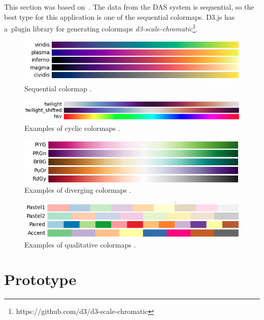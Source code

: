 This section was based on~\cite{colormap}. The data from the DAS system is sequential, so the best type for this application is one of the sequential colormaps. D3.js has a~plugin library for generating colormaps \textit{d3-scale-chromatic}\footnote{https://github.com/d3/d3-scale-chromatic}.

\begin{figure}[h!]
    \centering
    \includegraphics[width=.7\linewidth]{obrazky/sequential.png}
    \caption{Sequential colormap \cite{colormap}.}
    \label{fig:colormap.seq}
\end{figure}

\begin{figure}[h!]
    \centering
    \includegraphics[width=.7\linewidth]{obrazky/cyclic.png}
    \caption{Examples of cyclic colormaps \cite{colormap}.}
    \label{fig:colormap.cyc}
\end{figure}


\begin{figure}[h!]
    \centering
    \includegraphics[width=.7\linewidth]{obrazky/diverging.png}
    \caption{Examples of diverging colormaps \cite{colormap}.}
    \label{fig:colormap.div}
\end{figure}

\begin{figure}[h!]
    \centering
    \includegraphics[width=.7\linewidth]{obrazky/qualitative.png}
    \caption{Examples of qualitative colormaps \cite{colormap}.}
    \label{fig:colormap.qua}
\end{figure}


\bigskip
\section{Prototype}\label{txt.design.frontend.prototype}

